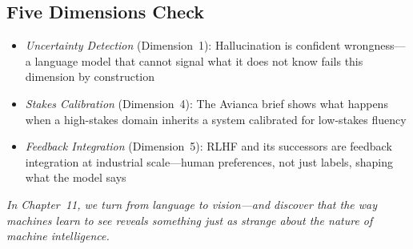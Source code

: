 \subsection*{Five Dimensions Check}

\begin{itemize}
    \item \textit{Uncertainty Detection} (Dimension~1): Hallucination is confident wrongness---a language model that cannot signal what it does not know fails this dimension by construction
    \item \textit{Stakes Calibration} (Dimension~4): The Avianca brief shows what happens when a high-stakes domain inherits a system calibrated for low-stakes fluency
    \item \textit{Feedback Integration} (Dimension~5): RLHF and its successors are feedback integration at industrial scale---human preferences, not just labels, shaping what the model says
\end{itemize}

\noindent\textit{In Chapter~11, we turn from language to vision---and discover that the way machines learn to see reveals something just as strange about the nature of machine intelligence.}
